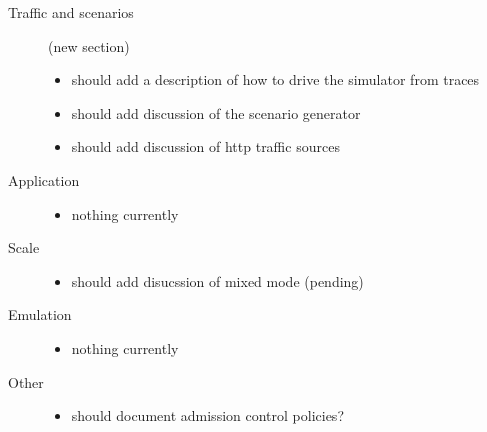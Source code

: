 \begin{description}
\item[Traffic and scenarios] (new section)

	\begin{itemize}
	\item should add a description of how to drive the simulator
		from traces
	\item should add discussion of the scenario generator
	\item should add discussion of http traffic sources
	\end{itemize}

\item[Application]

	\begin{itemize}
	\item nothing currently
	\end{itemize}

\item[Scale]

	\begin{itemize}
	\item should add disucssion of mixed mode (pending)
	\end{itemize}

\item[Emulation]

	\begin{itemize}
	\item nothing currently
	\end{itemize}

\item[Other]

	\begin{itemize}
	\item should document admission control policies?
	\end{itemize}

\end{description}

